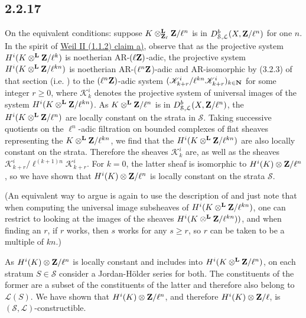 \documentclass[deligne.tex]{subfiles}
\begin{document}
	\subsection*{2.2.17} On the equivalent conditions: 
	suppose $K\otimes^{\mathbf{L}}_{\mathbf{Z}_\ell}\mathbf{Z}/\ell^n$ is in
	$D^b_{\mathcal S,\mathcal L}(X,\mathbf{Z}/\ell^n)$ for one $n$.
	In the spirit of \hyperref[WeilII_1.1.2]{Weil II (1.1.2) claim a)},
	observe that as the projective system $H^i(K\otimes^{\mathbf{L}}\mathbf{Z}/\ell^k)$
	is noetherian AR-$(\ell\mathbf{Z})$-adic, the projective system
	$H^i(K\otimes^{\mathbf{L}}\mathbf{Z}/\ell^{kn})$ is noetherian AR-($\ell^n\mathbf{Z}$)-adic
	and AR-isomorphic by (3.2.3) of that section (i.e. \cite[V, 3.2.3]{SGA5})
	to the $(\ell^n\mathbf{Z})$-adic system
	$(\mathscr K^i_{k+r}/\ell^{kn}\mathscr K^i_{k+r})_{k\in\mathbf{N}}$ for 
	some integer $r\geq 0$, where $\mathscr K^i_k$ denotes the projective 
	system of universal images of the system $H^i(K\otimes^{\mathbf{L}}\mathbf{Z}/\ell^{kn})$.
	As $K\otimes^{\mathbf{L}}\mathbf{Z}/\ell^n$ is in $D^b_{\mathcal S,\mathcal L}(X,\mathbf{Z}/\ell^n)$,
	the $H^i(K\otimes^{\mathbf{L}}\mathbf{Z}/\ell^n)$ are locally constant on the strata in
	$\mathcal S$. Taking successive quotients on the $\ell^n$-adic
	filtration on bounded complexes of flat sheaves representing the
	$K\otimes^{\mathbf{L}}\mathbf{Z}/\ell^{kn}$, we find that the $H^i(K\otimes^{\mathbf{L}}\mathbf{Z}/\ell^{kn})$
	are also locally constant on the strata. Therefore the sheaves
	$\mathscr K_k^i$ are, as well as the sheaves
	$\mathscr K^i_{k+r}/\ell^{(k+1)n}\mathscr K^i_{k+r}$.
	For $k=0$, the latter sheaf is isomorphic to $H^i(K)\otimes\mathbf{Z}/\ell^n$,
	so we have shown that $H^i(K)\otimes\mathbf{Z}/\ell^n$ is locally constant on
	the strata $\mathcal S$.
	
	(An equivalent way to argue is again to use the description of
	\cite[V, 3.2.3]{SGA5} and just note that when computing the universal
	image subsheaves of $H^i(K\otimes^{\mathbf{L}}\mathbf{Z}/\ell^{kn})$, one can restrict to
	looking at the images of the sheaves $H^i(K\otimes^{\mathbf{L}}\mathbf{Z}/\ell^{kn}))$, and 
	when finding an $r$, if $r$ works, then $s$ works for any $s\geq r$, so
	$r$ can be taken to be a multiple of $kn$.)
	
	As $H^i(K)\otimes\mathbf{Z}/\ell^n$ is locally constant and includes into
	$H^i(K\otimes^{\mathbf{L}}\mathbf{Z}/\ell^n)$, on each stratum $S\in\mathcal S$ consider a
	Jordan-Hölder series for both. The constituents of the former are a 
	subset of the constituents of the latter and therefore also belong to
	$\mathcal L(S)$. We have shown that $H^i(K)\otimes\mathbf{Z}/\ell^n$, and
	therefore $H^i(K)\otimes\mathbf{Z}/\ell$, is
	$(\mathcal S,\mathcal L)$-constructible.
	
\end{document}
